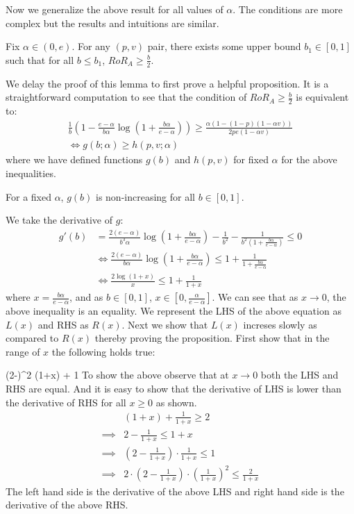 Now we generalize the above result for all values of $\alpha$. The conditions are more complex but the results and intuitions are similar. 

\begin{lemma}
Fix $\alpha \in (0, e)$. For any $(p,v)$ pair, there exists some upper bound $b_1 \in [0,1]$ such that for all $b \leq b_1$, $RoR_A \geq \frac{b}{2}$.
\end{lemma}

\proof
We delay the proof of this lemma to first prove a helpful proposition. It is a straightforward computation to see that the condition of $RoR_A \geq \frac{b}{2}$ is equivalent to:
\begin{gather*}
\frac{1}{b}\left(1-\frac{e-\alpha}{b\alpha}\log \left(1+\frac{b\alpha}{e-\alpha} \right) \right) \geq \frac{\alpha(1-(1-p)(1-\alpha v))}{2pe(1-\alpha v)} \\
\iff
g(b; \alpha) \geq h(p, v; \alpha)
\end{gather*}
where we have defined functions $g(b)$ and $h(p,v)$ for fixed $\alpha$ for the above inequalities. 

\begin{proposition}
For a fixed $\alpha$, $g(b)$ is non-increasing for all $b \in [0,1]$. 
\end{proposition}

\proof
We take the derivative of $g$:
\begin{align*}
g'(b) &= \frac{2(e-\alpha)}{b^3 \alpha} \log\left(1+\frac{b\alpha}{e-\alpha} \right) - \frac{1}{b^2}-\frac{1}{b^2\left(1+\frac{b\alpha}{e-\alpha}\right)} \leq 0 \\
&\iff \frac{2(e-\alpha)}{b \alpha} \log\left(1+\frac{b\alpha}{e-\alpha} \right) \leq 1+\frac{1}{1+\frac{b\alpha}{e-\alpha}} \\
&\iff \frac{2\log(1+x)}{x} \leq 1+\frac{1}{1+x}
\end{align*}
where $x = \frac{b\alpha}{e-\alpha}$, and as $b \in [0,1]$, $x \in [0, \frac{\alpha}{e-\alpha}]$. We can see that as $x \rightarrow 0$, the above inequality is an equality. 
We represent the LHS of the above equation as $L(x)$ and RHS as $R(x)$. Next we show that $L(x)$ increses slowly as compared to $R(x)$ thereby proving the proposition.
First show that in the range of $x$ the following holds true:

\beq
\label{eq:eq00}
\left(2-\right)^2 \log(1+x) + 1
\eeq
To show the above observe that at $x\rightarrow 0$ both the LHS and RHS are equal. And it is easy to show that the derivative of LHS is lower than the derivative of RHS for all $x\ge 0$ as shown.
\begin{align*}
& (1+x) + \frac{1}{1+x} \ge 2\\
\implies & 2 - \frac{1}{1+x} \le 1 + x\\
\implies & (2-\frac{1}{1+x})\cdot \frac{1}{1+x} \le 1\\
\implies & 2\cdot(2-\frac{1}{1+x})\cdot (\frac{1}{1+x})^2 \le \frac{2}{1+x}
\end{align*}
The left hand side is the derivative of the above LHS and right hand side is the derivative of the above RHS.

